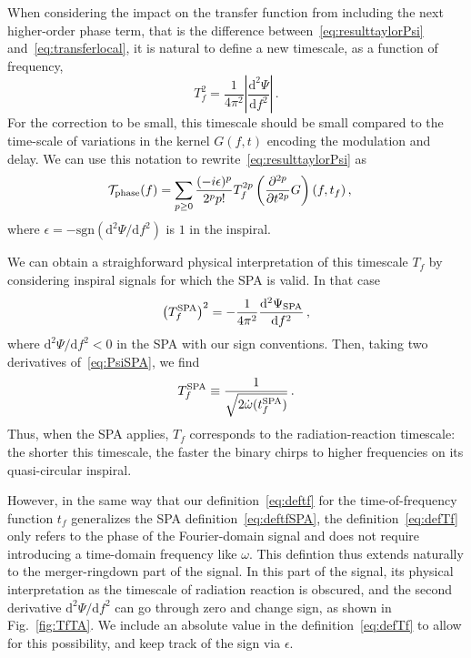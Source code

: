 \documentclass[aps,showpacs,twocolumn,
prd,superscriptaddress,nofootinbib]{revtex4-1}
\newcommand{\be}{\begin{equation}}
\newcommand{\ee}{\end{equation}}
\newcommand\ud{{\mathrm{d}}}
\newcommand\calT{{\mathcal{T}}}
\newcommand{\tf}{t_{f}}
\newcommand{\Tf}{T_{f}}
\newcommand{\tfSPA}{t_{f}^{\rm SPA}}
\begin{document}
When considering the impact on the transfer function from including the next higher-order phase term, that is the difference between~\eqref{eq:resulttaylorPsi} and~\eqref{eq:transferlocal}, it is natural to define a new timescale, as a function of frequency,
\be\label{eq:defTf}
	\Tf^{2} = \frac{1}{4\pi^{2}}\left| \frac{\ud^{2}\Psi}{\ud f^{2}} \right| \,.
\ee
For the correction to be small, this timescale should be small compared to the time-scale of variations in the kernel $G(f,t)$ encoding the modulation and delay. We can use this notation to rewrite~\eqref{eq:resulttaylorPsi} as
\begin{align}\label{eq:resultdffPsiTf}
	 \calT_{\rm phase}(f) &= \sum\limits_{p\geq 0} \frac{(-i\epsilon)^{p}}{2^{p}p!} \Tf^{2p} \left( \frac{\partial^{2p} }{\partial t^{2p}} G \right)(f, \tf) \,,
\end{align}
where $\epsilon = -\mathrm{sgn}(\ud^{2}\Psi/\ud f^{2} )$ is $1$ in the inspiral.

We can obtain a straighforward physical interpretation of this timescale $\Tf$ by considering inspiral signals for which the SPA is valid. In that case
\be
	\left(\Tf^{\rm SPA} \right)^{2} = -\frac{1}{4\pi^{2}}  \frac{\ud^{2} \Psi_{\rm SPA}}{\ud f^{2}} \,,
\ee
where $\ud^{2}\Psi/\ud f^{2} < 0$ in the SPA with our sign conventions.
Then, taking two derivatives of~\eqref{eq:PsiSPA}, we find
\be\label{eq:TfSPA}
	\Tf^{\rm SPA} \equiv \frac{1}{\sqrt{2\dot{\omega}(\tfSPA)}} \,.
\ee
Thus, when the SPA applies, $\Tf$ corresponds to the radiation-reaction timescale: the shorter this timescale, the faster the binary chirps to higher frequencies on its quasi-circular inspiral. 

However, in the same way that our definition~\eqref{eq:deftf} for the time-of-frequency function $t_{f}$ generalizes the SPA definition~\eqref{eq:deftfSPA}, the definition~\eqref{eq:defTf} only refers to the phase of the Fourier-domain signal and does not require introducing a time-domain frequency like $\omega$. This defintion thus extends naturally to the merger-ringdown part of the signal. In this part of the signal, its physical interpretation as the timescale of radiation reaction is obscured, and the second derivative $\ud^{2}\Psi/\ud f^{2}$ can go through zero and change sign, as shown in Fig.~\ref{fig:TfTA}. We include an absolute value in the definition~\eqref{eq:defTf} to allow for this possibility, and keep track of the sign via $\epsilon$.
\end{document}
